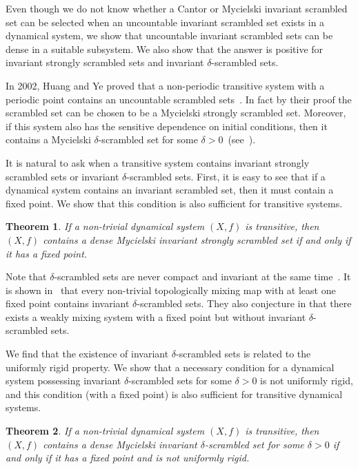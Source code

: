 \documentclass[reqno,a4paper,12pt]{amsart}
\newtheorem{thmx}{Theorem}
\theoremstyle{definition}
\numberwithin{equation}{section}
\begin{document}
Even though we do not know whether a Cantor or Mycielski invariant scrambled set can be selected when an
uncountable invariant scrambled set exists in a dynamical system, we show that
uncountable invariant scrambled sets can be dense in a suitable subsystem.
We also show that the answer is positive for invariant strongly scrambled sets and  invariant $\delta$-scrambled sets.

In 2002, Huang and Ye proved that a non-periodic transitive system with a periodic point contains
an uncountable scrambled sets~\cite{HY02}.
In fact by their proof the scrambled set can be chosen to be a Mycielski strongly scrambled set.
Moreover, if this system also has the sensitive dependence
on initial conditions, then it contains a Mycielski $\delta$-scrambled set for some $\delta>0$~(see~\cite{M14}).

It is natural to ask when a transitive system contains invariant strongly scrambled sets or
invariant $\delta$-scrambled sets.
First, it is easy to see that if  a dynamical system contains an invariant scrambled set, then it must contain
a fixed point. We show that this condition is also sufficient for transitive systems.

\begin{thmx}\label{thm:B}
If a non-trivial dynamical system $(X,f)$ is transitive,
then $(X,f)$ contains a dense Mycielski invariant strongly scrambled set
if and only if it has a fixed point.
\end{thmx}

Note that $\delta$-scrambled sets are never compact and invariant at the same time~\cite{BHS}.
It is shown in~\cite{BGO10} that every non-trivial topologically mixing map with at least one fixed point contains invariant $\delta$-scrambled sets.
They also conjecture in \cite{BGO10} that there exists a weakly mixing system with a fixed point
but without invariant $\delta$-scrambled sets.

We find that the existence of invariant $\delta$-scrambled sets is related to the uniformly rigid property.
We show that a necessary condition for a dynamical system
possessing invariant $\delta$-scrambled sets for some $\delta>0$  is not uniformly rigid,
and this condition (with a fixed point) is also sufficient for transitive dynamical systems.

\begin{thmx}\label{thm:C}
If a non-trivial dynamical system $(X,f)$ is transitive, then $(X,f)$ contains
a dense Mycielski invariant $\delta$-scrambled set for some $\delta>0$
if and only if it has a fixed point and is not uniformly rigid.
\end{thmx}
\end{document}
